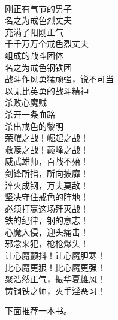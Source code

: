 \begin{poem}[戒色烈丈夫]
    \begin{multicols}{2}
        \centering~\\
        刚正有气节的男子 \\ 名之为戒色烈丈夫 \\ 充满了阳刚正气 \\ 千千万万个戒色烈丈夫 \\ 组成的战斗团体 \\ 名之为戒色钢铁团 \\ 战斗作风勇猛顽强，锐不可当 \\ 以无比英勇的战斗精神 \\ 杀败心魔贼 \\ 杀开一条血路 \\ 杀出戒色的黎明 \\ 荣耀之战！崛起之战！ \\ 救赎之战！巅峰之战！ \\ 威武雄师，百战不殆！ \\ 剑锋所指，所向披靡！ \\ 淬火成钢，万夫莫敌！ \\ 坚决守住戒色的阵地！ \\ 必须打赢这场歼灭战！ \\ 铁的纪律，钢的意志！ \\ 心魔入侵，迎头痛击！ \\ 邪念来犯，枪枪爆头！ \\ 让心魔颤抖！让心魔胆寒！ \\ 比心魔更狠！比心魔更强！ \\ 聚浩然正气，振华夏雄风！ \\ 铸钢铁之师，灭手淫恶习！
    \end{multicols}
\end{poem}

下面推荐一本书。

